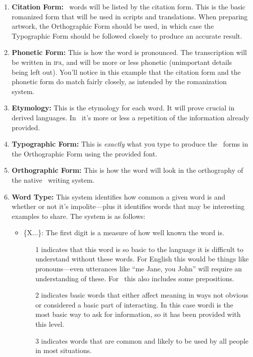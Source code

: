 \begin{enumerate}
\item
\textbf{Citation Form:}
\LanguageName\ words will be listed by the citation form.
This is the basic romanized form that will be used in scripts and translations.
When preparing artwork, the Orthographic Form should be used, in which case the Typographic Form should be followed closely to produce an accurate result.
\item
\textbf{Phonetic Form:}
This is how the word is pronounced.
The transcription will be written in \textsc{ipa}, and will be more or less phonetic (unimportant details being left out).
You'll notice in this example that the citation form and the phonetic form do match fairly closely, as intended by the romanization system.
\item
\textbf{Etymology:}
This is the etymology for each word.
It will prove crucial in derived languages.
In \LanguageName\ it's more or less a repetition of the information already provided.
\item
\textbf{Typographic Form:}
This is \emph{exactly} what you type to produce the \LanguageName\ forms in the Orthographic Form using the provided font.
\item
\textbf{Orthographic Form:}
This is how the word will look in the orthography of the native \LanguageName\ writing system.
\item
\textbf{Word Type:}
This system identifies how common a given word is and whether or not it's impolite---plus it identifies words that may be interesting examples to share.
The system is as follows:
\begin{itemize}
\item
\{X$\ldots$\}:
The first digit is a measure of how well known the word is.
\begin{enumerate}
\item[1]
indicates that this word is so basic to the language it is difficult to understand without these words.
For English this would be things like pronouns---even utterances like ``me Jane, you John'' will require an understanding of these.
For \LanguageName\ this also includes some prepositions.
\item[2]
indicates basic words that either affect meaning in ways not obvious or considered a basic part of interacting.
In this case wordi is the most basic way to ask for information, so it has been provided with this level.
\item[3]
indicates words that are common and likely to be used by all people in most situations.

\end{enumerate}
\end{itemize}
\end{enumerate}
